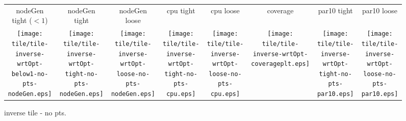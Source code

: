 \documentclass[a4paper,landscape]{article}
\begin{document}
\begin{figure}[t]
	\centering
    \begin{tabular}{c c c c c c c c}
        nodeGen tight ($<1$) & nodeGen tight & nodeGen loose & cpu
        tight & cpu loose & coverage & par10 tight & par10 loose\\
	   \begin{minipage}{\cpufigureplotwidth}
      \texttt{[image: tile/tile-inverse-wrtOpt-below1-no-pts-nodeGen.eps]}
        \end{minipage}&
        \begin{minipage}{\cpufigureplotwidth}
        \texttt{[image: tile/tile-inverse-wrtOpt-tight-no-pts-nodeGen.eps]}
        \end{minipage}&
        \begin{minipage}{\cpufigureplotwidth}
      \texttt{[image: tile/tile-inverse-wrtOpt-loose-no-pts-nodeGen.eps]}
      \end{minipage}&
        \begin{minipage}{\cpufigureplotwidth}
        \texttt{[image: tile/tile-inverse-wrtOpt-tight-no-pts-cpu.eps]}
        \end{minipage}&
        \begin{minipage}{\cpufigureplotwidth}
        \texttt{[image: tile/tile-inverse-wrtOpt-loose-no-pts-cpu.eps]}
        \end{minipage}&
        \begin{minipage}{\cpufigureplotwidth}
        \texttt{[image: tile/tile-inverse-wrtOpt-coverageplt.eps]}
        \end{minipage}&
        \begin{minipage}{\cpufigureplotwidth}
        \texttt{[image: tile/tile-inverse-wrtOpt-tight-no-pts-par10.eps]}
        \end{minipage}&
        \begin{minipage}{\cpufigureplotwidth}
        \texttt{[image: tile/tile-inverse-wrtOpt-loose-no-pts-par10.eps]}
        \end{minipage}
	\end{tabular}
\caption{inverse tile - no pts.}
\label{fig:tile-inverse-no-pts}
\end{figure}
\end{document}

